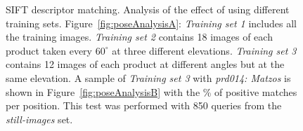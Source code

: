 \begin{figure}[h]
\centering
{}


\caption{SIFT descriptor matching. Analysis of the effect of using different training sets. Figure~\ref{fig:poseAnalysisA}: \textit{Training set 1} includes all the training images. \textit{Training set 2} contains 18 images of each product taken every $60^\circ$ at three different elevations. \textit{Training set 3} contains 12 images of each product at different angles but at the same elevation. A sample of \textit{Training set 3} with \textit{prd014: Matzos} is shown in Figure~\ref{fig:poseAnalysisB} with the \% of positive matches per position. This test was performed with 850 queries from the \textit{still-images} set.}
        \label{fig:poseAnalysis}
\end{figure}


